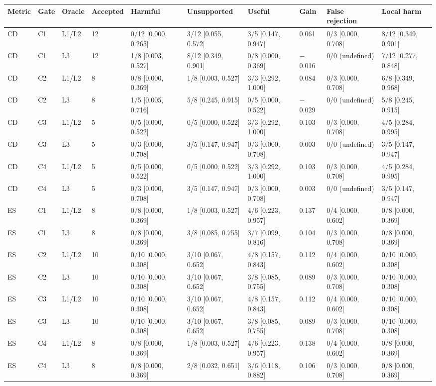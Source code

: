 \begin{tabular}{llllllllll}
\toprule
Metric & Gate & Oracle & Accepted & Harmful & Unsupported & Useful & Gain & False rejection & Local harm \\
\midrule
CD & C1 & L1/L2 & 12 & 0/12 [0.000, 0.265] & 3/12 [0.055, 0.572] & 3/5 [0.147, 0.947] & 0.061 & 0/3 [0.000, 0.708] & 8/12 [0.349, 0.901] \\
CD & C1 & L3 & 12 & 1/8 [0.003, 0.527] & 8/12 [0.349, 0.901] & 0/8 [0.000, 0.369] & $-$0.016 & 0/0 (undefined) & 7/12 [0.277, 0.848] \\
CD & C2 & L1/L2 & 8 & 0/8 [0.000, 0.369] & 1/8 [0.003, 0.527] & 3/3 [0.292, 1.000] & 0.084 & 0/3 [0.000, 0.708] & 6/8 [0.349, 0.968] \\
CD & C2 & L3 & 8 & 1/5 [0.005, 0.716] & 5/8 [0.245, 0.915] & 0/5 [0.000, 0.522] & $-$0.029 & 0/0 (undefined) & 5/8 [0.245, 0.915] \\
CD & C3 & L1/L2 & 5 & 0/5 [0.000, 0.522] & 0/5 [0.000, 0.522] & 3/3 [0.292, 1.000] & 0.103 & 0/3 [0.000, 0.708] & 4/5 [0.284, 0.995] \\
CD & C3 & L3 & 5 & 0/3 [0.000, 0.708] & 3/5 [0.147, 0.947] & 0/3 [0.000, 0.708] & 0.003 & 0/0 (undefined) & 3/5 [0.147, 0.947] \\
CD & C4 & L1/L2 & 5 & 0/5 [0.000, 0.522] & 0/5 [0.000, 0.522] & 3/3 [0.292, 1.000] & 0.103 & 0/3 [0.000, 0.708] & 4/5 [0.284, 0.995] \\
CD & C4 & L3 & 5 & 0/3 [0.000, 0.708] & 3/5 [0.147, 0.947] & 0/3 [0.000, 0.708] & 0.003 & 0/0 (undefined) & 3/5 [0.147, 0.947] \\
ES & C1 & L1/L2 & 8 & 0/8 [0.000, 0.369] & 1/8 [0.003, 0.527] & 4/6 [0.223, 0.957] & 0.137 & 0/4 [0.000, 0.602] & 0/8 [0.000, 0.369] \\
ES & C1 & L3 & 8 & 0/8 [0.000, 0.369] & 3/8 [0.085, 0.755] & 3/7 [0.099, 0.816] & 0.104 & 0/3 [0.000, 0.708] & 0/8 [0.000, 0.369] \\
ES & C2 & L1/L2 & 10 & 0/10 [0.000, 0.308] & 3/10 [0.067, 0.652] & 4/8 [0.157, 0.843] & 0.112 & 0/4 [0.000, 0.602] & 0/10 [0.000, 0.308] \\
ES & C2 & L3 & 10 & 0/10 [0.000, 0.308] & 3/10 [0.067, 0.652] & 3/8 [0.085, 0.755] & 0.089 & 0/3 [0.000, 0.708] & 0/10 [0.000, 0.308] \\
ES & C3 & L1/L2 & 10 & 0/10 [0.000, 0.308] & 3/10 [0.067, 0.652] & 4/8 [0.157, 0.843] & 0.112 & 0/4 [0.000, 0.602] & 0/10 [0.000, 0.308] \\
ES & C3 & L3 & 10 & 0/10 [0.000, 0.308] & 3/10 [0.067, 0.652] & 3/8 [0.085, 0.755] & 0.089 & 0/3 [0.000, 0.708] & 0/10 [0.000, 0.308] \\
ES & C4 & L1/L2 & 8 & 0/8 [0.000, 0.369] & 1/8 [0.003, 0.527] & 4/6 [0.223, 0.957] & 0.138 & 0/4 [0.000, 0.602] & 0/8 [0.000, 0.369] \\
ES & C4 & L3 & 8 & 0/8 [0.000, 0.369] & 2/8 [0.032, 0.651] & 3/6 [0.118, 0.882] & 0.106 & 0/3 [0.000, 0.708] & 0/8 [0.000, 0.369] \\
\bottomrule
\end{tabular}
